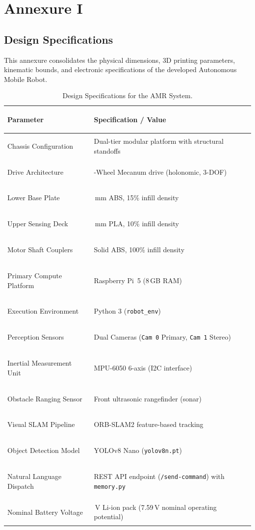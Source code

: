 \newpage
\thispagestyle{plain}

\chapter*{Annexure I}

{\centering \section*{Design Specifications}}

\vspace{0.5cm}
\noindent
This annexure consolidates the physical dimensions, 3D printing parameters, kinematic bounds, and electronic specifications of the developed Autonomous Mobile Robot.

\vspace{0.5cm}

\begin{table}[htbp]
\centering
\small
\caption{Design Specifications for the AMR System.}
\label{tab:design_specifications}
\renewcommand{\arraystretch}{1.3}
\begin{tabularx}{\textwidth}{>{\bfseries\raggedright\arraybackslash}p{6.0cm} >{\raggedright\arraybackslash}X}
\hline
\textbf{Parameter} & \textbf{Specification / Value} \\ \hline
Chassis Configuration & Dual-tier modular platform with structural standoffs \\ \hline
Drive Architecture & 4-Wheel Mecanum drive (holonomic, 3-DOF) \\ \hline
Lower Base Plate & 6\,mm ABS, 15\% infill density \\ \hline
Upper Sensing Deck & 4\,mm PLA, 10\% infill density \\ \hline
Motor Shaft Couplers & Solid ABS, 100\% infill density \\ \hline
Primary Compute Platform & Raspberry Pi~5 (8\,GB RAM) \\ \hline
Execution Environment & Python 3 (\texttt{robot\_env}) \\ \hline
Perception Sensors & Dual Cameras (\texttt{Cam~0} Primary, \texttt{Cam~1} Stereo) \\ \hline
Inertial Measurement Unit & MPU-6050 6-axis (I2C interface) \\ \hline
Obstacle Ranging Sensor & Front ultrasonic rangefinder (sonar) \\ \hline
Visual SLAM Pipeline & ORB-SLAM2 feature-based tracking \\ \hline
Object Detection Model & YOLOv8 Nano (\texttt{yolov8n.pt}) \\ \hline
Natural Language Dispatch & REST API endpoint (\texttt{/send-command}) with \texttt{memory.py} \\ \hline
Nominal Battery Voltage & 7.4\,V Li-ion pack (7.59\,V nominal operating potential) \\ \hline
\end{tabularx}
\end{table}